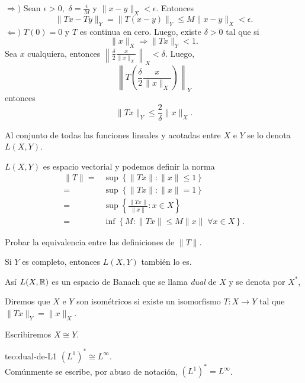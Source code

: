 \begin{demo}
$\Rightarrow)$ Sean $\epsilon>0,$  $\delta=\frac{\epsilon}{M}$ y 
$\|x-y\|_X <\epsilon.$
Entonces
\[
\|Tx-Ty\|_Y = \|T(x-y)\|_Y \leq M \|x-y\|_X<\epsilon.
\]
$\Leftarrow)$ $T(0)=0$ y $T$ es continua en cero. Luego, existe $\delta>0$ tal que si 
\[
\|x\|_X \Rightarrow \|Tx\|_Y<1.
\]
Sea $x$ cualquiera, entonces $\left\|\frac{\delta}{2} \frac{x}{\|x\|_X}\right\|_X<\delta$. 
Luego, 
\[
\left\|T\left( \frac{\delta}{2} \frac{x}{\|x\|_X}   \right)\right\|_Y
\]
entonces
\[ 
\|Tx\|_Y \leq \frac{2}{\delta}\|x\|_X.
\]
\end{demo}

Al conjunto de todas las funciones lineales y acotadas entre $X$ e $Y$ se lo denota $L(X,Y)$.

$L(X,Y)$ es espacio vectorial y podemos definir la norma
\[
\begin{split}
\|T\|=&\sup\left\{ \|Tx\|: \|x\|\leq 1\right\}\\
=&\sup\left\{ \|Tx\|: \|x\| = 1\right\}\\
=&\sup\left\{ \frac{\|Tx\|}{\|x\|}: x \in X\right\}\\
=&\inf\left\{ M: \|Tx\|\leq M \|x\|\;\forall x \in X\right\}.
\end{split}
\]

\begin{ejercicio}{}
Probar la equivalencia entre las definiciones de $\|T\|.$
\end{ejercicio}

\begin{ejercicio}{}
Si $Y$ es completo, entonces $L(X,Y)$ tambi\'en lo es.
\end{ejercicio}

As\'i $L(X,\mathbb{R})$ es un espacio de Banach que se llama \emph{dual} de $X$ y se denota por $X^*$,

Diremos que $X$ e $Y$ son isom\'etricos si existe un isomorfismo $T:X\to Y$ tal que $\|Tx\|_Y=\|x\|_X$. 

Escribiremos $X \cong Y$.

\begin{teorema}{teo:dual-de-L1}
$(L^1)^* \cong L^{\infty}.$
\\
Com\'unmente se escribe, por abuso de notaci\'on, $(L^1)^{*}=L^{\infty}$.
\end{teorema}

